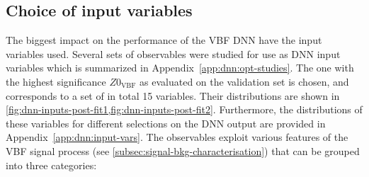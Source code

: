 \subsection{Choice of input variables}
\label{subsec:input-variables-opt}
The biggest impact on the performance of the VBF DNN have the input variables used.
Several sets of observables were studied for use as DNN input variables which is summarized in Appendix~\ref{app:dnn:opt-studies}.
The one with the highest significance $Z0_\mathrm{VBF}$ as evaluated on the validation set is chosen, and corresponds to a set of in total 15 variables.
Their distributions are shown in \cref{fig:dnn-inputs-post-fit1,fig:dnn-inputs-post-fit2}.
Furthermore, the distributions of these variables for different selections on the DNN output are provided in Appendix~\ref{app:dnn:input-vars}. 
The observables exploit various features of the VBF signal process (see \cref{subsec:signal-bkg-characterisation}) that can be grouped into three categories:

